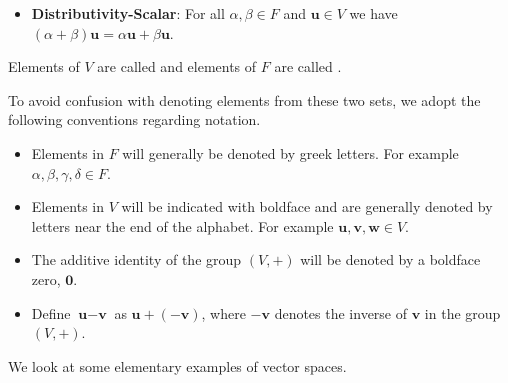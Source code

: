 \begin{definition}
\begin{itemize}
        \item \textbf{Distributivity-Scalar}: For all $\alpha, \beta \in F$ and $\textbf{u} \in V$ we have $(\alpha+\beta)\textbf{u} = \alpha\textbf{u} + \beta\textbf{u}$.
    \end{itemize}
    Elements of $V$ are called  and elements of $F$ are called .
\end{definition}

To avoid confusion with denoting elements from these two sets, we adopt the following conventions regarding notation.
\begin{itemize}
    \item Elements in $F$ will generally be denoted by greek letters. For example $\alpha, \beta, \gamma, \delta \in F$.
    \item Elements in $V$ will be indicated with boldface and are generally denoted by letters near the end of the alphabet. For example $\textbf{u}, \textbf{v}, \textbf{w} \in V$.
    \item The additive identity of the group $(V, +)$ will be denoted by a boldface zero, $\textbf{0}$.
    \item Define $\textbf{u} - \textbf{v}$ as $\textbf{u} + (-\textbf{v})$, where $-\textbf{v}$ denotes the inverse of $\textbf{v}$ in the group $(V, +)$.
\end{itemize}

We look at some elementary examples of vector spaces.

